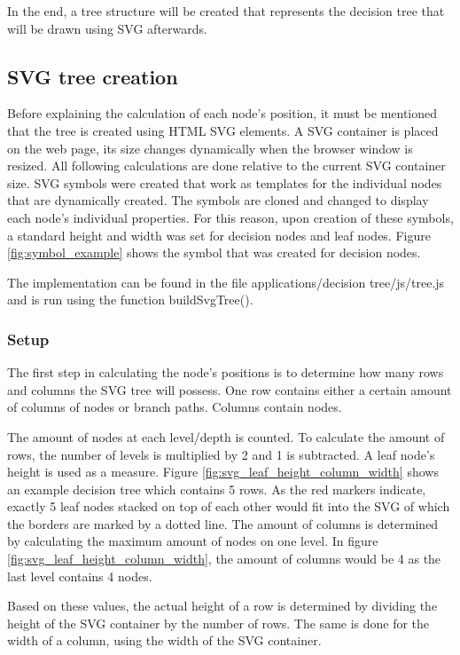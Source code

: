 In the end, a tree structure will be created that represents the decision tree that will be drawn using SVG afterwards.

\subsection{SVG tree creation}
Before explaining the calculation of each node's position, it must be mentioned that the tree is created using HTML SVG elements. A SVG container is placed on the web page, its size changes dynamically when the browser window is resized. All following calculations are done relative to the current SVG container size. SVG symbols were created that work as templates for the individual nodes that are dynamically created. The symbols are cloned and changed to display each node's individual properties. For this reason, upon creation of these symbols, a standard height and width was set for decision nodes and leaf nodes. Figure \ref{fig:symbol_example} shows the symbol that was created for decision nodes.


The implementation can be found in the file applications/decision tree/js/tree.js and is run using the function buildSvgTree().

\subsubsection{Setup}
The first step in calculating the node's positions is to determine how many rows and columns the SVG tree will possess. One row contains either a certain amount of columns of nodes or branch paths. Columns contain nodes.

The amount of nodes at each level/depth is counted. To calculate the amount of rows, the number of levels is multiplied by 2 and 1 is subtracted. A leaf node's height is used as a measure. Figure \ref{fig:svg_leaf_height_column_width} shows an example decision tree which contains 5 rows.
As the red markers indicate, exactly 5 leaf nodes stacked on top of each other would fit into the SVG of which the borders are marked by a dotted line. The amount of columns is determined by calculating the maximum amount of nodes on one level. In figure \ref{fig:svg_leaf_height_column_width}, the amount of columns would be 4 as the last level contains 4 nodes.

Based on these values, the actual height of a row is determined by dividing the height of the SVG container by the number of rows. The same is done for the width of a column, using the width of the SVG container.

